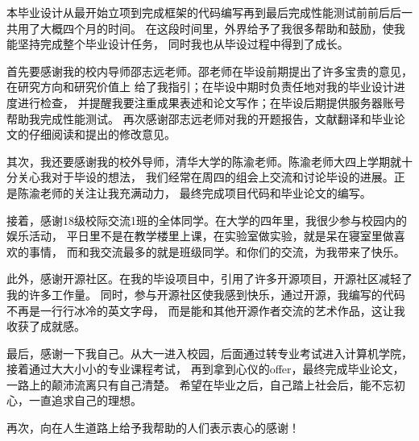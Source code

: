 \documentclass[supercite]{HustGraduPaper}
\theoremstyle{definition}
\begin{document}
\begin{thankpage}

本毕业设计从最开始立项到完成框架的代码编写再到最后完成性能测试前前后后一共用了大概四个月的时间。
在这段时间里，外界给予了我很多帮助和鼓励，使我能坚持完成整个毕业设计任务，
同时我也从毕设过程中得到了成长。\par

首先要感谢我的校内导师邵志远老师。邵老师在毕设前期提出了许多宝贵的意见，在研究方向和研究价值上
给了我指引；在毕设中期时负责任地对我的毕业设计进度进行检查，
并提醒我要注重成果表述和论文写作；在毕设后期提供服务器账号帮助我完成性能测试。
再次感谢邵志远老师对我的开题报告，文献翻译和毕业论文的仔细阅读和提出的修改意见。\par

其次，我还要感谢我的校外导师，清华大学的陈渝老师。陈渝老师大四上学期就十分关心我对于毕设的想法，
我们经常在周四的组会上交流和讨论毕设的进展。正是陈渝老师的关注让我充满动力，
最终完成项目代码和毕业论文的编写。\par

接着，感谢18级校际交流1班的全体同学。在大学的四年里，我很少参与校园内的娱乐活动，
平日里不是在教学楼里上课，在实验室做实验，就是呆在寝室里做喜欢的事情，
而和我交流最多的就是班级同学。和你们的交流，为我带来了快乐。\par

此外，感谢开源社区。在我的毕设项目中，引用了许多开源项目，开源社区减轻了我的许多工作量。
同时，参与开源社区使我感到快乐，通过开源，我编写的代码不再是一行行冰冷的英文字母，
而是能和其他开源作者交流的艺术作品，这让我收获了成就感。\par

最后，感谢一下我自己。从大一进入校园，后面通过转专业考试进入计算机学院，
接着通过大大小小的专业课程考试，
再到拿到心仪的offer，最终完成毕业论文，一路上的颠沛流离只有自己清楚。
希望在毕业之后，自己踏上社会后，能不忘初心，一直追求自己的理想。\par

再次，向在人生道路上给予我帮助的人们表示衷心的感谢！\par

\end{thankpage}

\nocite{*}


\end{document}
